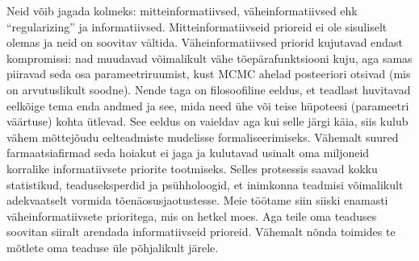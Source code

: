 \documentclass[]{book}
\begin{document}
Neid võib jagada kolmeks: mitteinformatiivsed, väheinformatiivsed ehk
``regularizing'' ja informatiivsed. Mitteinformatiivseid prioreid ei ole
sisuliselt olemas ja neid on soovitav vältida. Väheinformatiivsed
priorid kujutavad endast kompromissi: nad muudavad võimalikult vähe
tõepärafunktsiooni kuju, aga samas piiravad seda osa parameetriruumist,
kust MCMC ahelad posteeriori otsivad (mis on arvutuslikult soodne).
Nende taga on filosoofiline eeldus, et teadlast huvitavad eelkõige tema
enda andmed ja see, mida need ühe või teise hüpoteesi (parameetri
väärtuse) kohta ütlevad. See eeldus on vaieldav aga kui selle järgi
käia, siis kulub vähem mõttejõudu eelteadmiste mudelisse
formaliseerimiseks. Vähemalt suured farmaatsiafirmad seda hoiakut ei
jaga ja kulutavad usinalt oma miljoneid korralike informatiivsete
priorite tootmiseks. Selles protsessis saavad kokku statistikud,
teaduseksperdid ja psühholoogid, et inimkonna teadmisi võimalikult
adekvaatselt vormida tõenäosusjaotustesse. Meie töötame siin siiski
enamasti väheinformatiivsete prioritega, mis on hetkel moes. Aga teile
oma teaduses soovitan siiralt arendada informatiivseid prioreid.
Vähemalt nõnda toimides te mõtlete oma teaduse üle põhjalikult järele.


\end{document}
